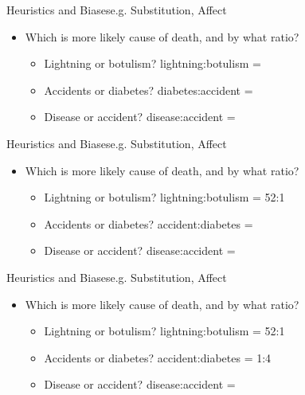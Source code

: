 \documentclass{beamer}
\begin{document}
\begin{frame}{Heuristics and Biases}{e.g. Substitution, Affect}
\begin{itemize}
\item Which is more likely cause of death, and by what ratio? 
    \begin{itemize}
    \addtolength{\itemsep}{0.5\baselineskip}
    \item Lightning or botulism? lightning:botulism = 
    \item Accidents or diabetes? diabetes:accident = 
    \item Disease or accident? disease:accident = 
    \end{itemize}
\end{itemize}
\end{frame}

\begin{frame}{Heuristics and Biases}{e.g. Substitution, Affect}
\begin{itemize}
\item Which is more likely cause of death, and by what ratio? 
    \begin{itemize}
    \addtolength{\itemsep}{0.5\baselineskip}
    \item Lightning or botulism? lightning:botulism = 52:1
    \item Accidents or diabetes? accident:diabetes = 
    \item Disease or accident? disease:accident = 
    \end{itemize}
\end{itemize}
\end{frame}

\begin{frame}{Heuristics and Biases}{e.g. Substitution, Affect}
\begin{itemize}
\item Which is more likely cause of death, and by what ratio? 
    \begin{itemize}
    \addtolength{\itemsep}{0.5\baselineskip}
    \item Lightning or botulism? lightning:botulism = 52:1
    \item Accidents or diabetes? accident:diabetes = 1:4
    \item Disease or accident? disease:accident = 
    \end{itemize}
\end{itemize}
\end{frame}
\end{document}
